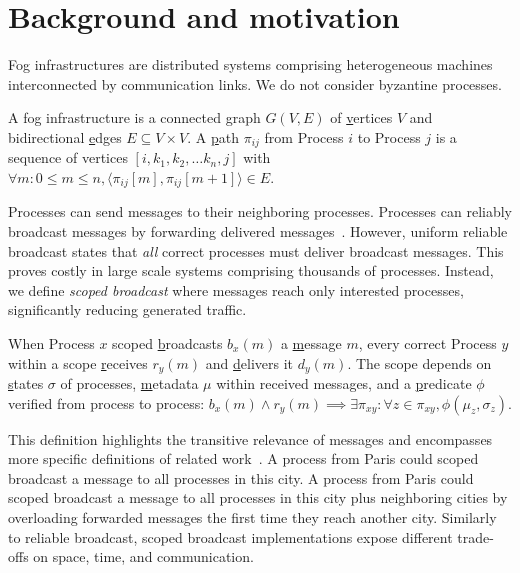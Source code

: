 
\section{Background and motivation}
\label{sec:background}

Fog infrastructures are distributed systems comprising heterogeneous
machines interconnected by communication links. We do not consider
byzantine processes.

\begin{definition}
  A fog infrastructure is a connected \underline{g}raph $G(V, E)$ of
  \underline{v}ertices $V$ and bidirectional \underline{e}dges $E
  \subseteq V \times V$.  A \underline{p}ath $\pi_{ij}$ from Process
  $i$ to Process $j$ is a sequence of vertices $[i, k_1, k_2, \ldots
    k_n, j]$ with $\forall m: 0\leq m \leq n, \langle \pi_{ij}[m],
  \pi_{ij}[m+1] \rangle \in E$.
\end{definition}

Processes can send messages to their neighboring processes. Processes
can reliably broadcast messages by forwarding delivered
messages~\cite{hadzilacos1994modular,nedelec2018causal,raynal2013distributed}. However,
uniform reliable broadcast states that \emph{all} correct processes
must deliver broadcast messages. This proves costly in large scale
systems comprising thousands of processes. Instead, we define
\emph{scoped broadcast} where messages reach only interested
processes, significantly reducing generated traffic.

\begin{definition}
  When Process $x$ scoped \underline{b}roadcasts $b_x(m)$ a
  \underline{m}essage $m$, every correct Process $y$ within a scope
  \underline{r}eceives $r_y(m)$ and \underline{d}elivers it
  $d_y(m)$. The scope depends on \underline{s}tates $\sigma$ of
  processes, \underline{m}etadata $\mu$ within received messages, and
  a \underline{p}redicate $\phi$ verified from process to process:
  $b_x(m) \wedge r_y(m) \implies \exists \pi_{xy} : \forall z \in
  \pi_{xy}, \phi(\mu_z, \sigma_z)$.
\end{definition}

This definition highlights the transitive relevance of messages and
encompasses more specific definitions of related
work~\cite{hsiao2005scoped,lue2006scoped,wang2015prodiluvian}.  A
process from Paris could scoped broadcast a message to all processes
in this city. A process from Paris could scoped broadcast a message to
all processes in this city plus neighboring cities by overloading
forwarded messages the first time they reach another city. Similarly
to reliable broadcast, scoped broadcast implementations expose
different trade-offs on space, time, and communication.


